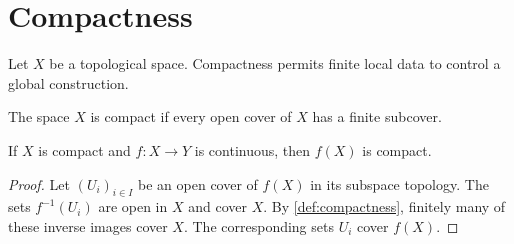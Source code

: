 \chapter{Compactness}
\label{chap:compactness}
Let $X$ be a topological space. Compactness permits finite local data to control a global construction.
\begin{definition}
\label{def:compactness}
The space $X$ is compact if every open cover of $X$ has a finite subcover.
\end{definition}
\begin{lemma}
\label{lem:compact-image}
If $X$ is compact and $f\colon X\to Y$ is continuous, then $f(X)$ is compact.
\end{lemma}
\begin{proof}
Let $(U_i)_{i\in I}$ be an open cover of $f(X)$ in its subspace topology. The sets $f^{-1}(U_i)$ are open in $X$ and cover $X$. By \cref{def:compactness}, finitely many of these inverse images cover $X$. The corresponding sets $U_i$ cover $f(X)$.
\end{proof}
